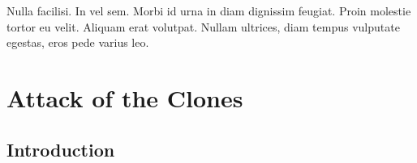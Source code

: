 \graphicspath{{figures/chapter-3/}}


\begin{savequote}[75mm]
Nulla facilisi. In vel sem. Morbi id urna in diam dignissim feugiat. Proin molestie tortor eu velit. Aliquam erat volutpat. Nullam    ultrices, diam tempus vulputate egestas, eros pede varius leo.
\end{savequote}

\chapter{Attack of the Clones}


\section{Introduction}

\lipsum[7-10]
\cite{Salmon2006}



